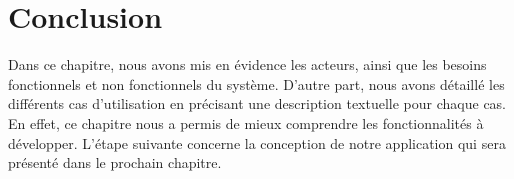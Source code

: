 \section*{Conclusion}
Dans ce chapitre, nous avons mis en évidence les acteurs, ainsi que les besoins fonctionnels et non fonctionnels du système.
D'autre part, nous avons détaillé les différents cas d'utilisation en précisant une description textuelle pour chaque cas. En effet, ce chapitre nous a permis de mieux comprendre les fonctionnalités à développer. L'étape suivante concerne la conception de notre application qui sera présenté dans le prochain chapitre.

